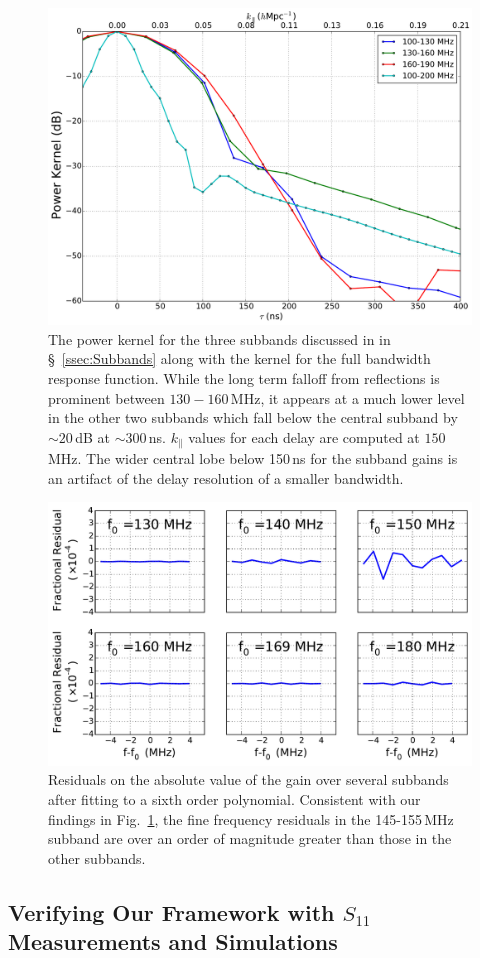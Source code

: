 \documentclass[twocolumn]{emulateapj}
\begin{document}
\begin{figure}[h!]
\includegraphics[width=.5\textwidth]{figures/powerKernelSubbands.pdf}
\caption{The power kernel for the three subbands discussed in in \S~\ref{ssec:Subbands} along with the kernel for the full bandwidth response function. While the long term falloff from reflections is prominent between $130-160$\,MHz, it appears at a much lower level in the other two subbands which fall below the central subband by $\sim 20$\,dB at $\sim 300$\,ns. $k_\parallel$ values for each delay are computed at $150$\,MHz. The wider central lobe below 150\,ns for the subband gains is an artifact of the delay resolution of a smaller bandwidth.}
\label{fig:KernelsSubbands}
\end{figure}

\begin{figure}
\includegraphics[width=.5\textwidth]{figures/frequency_domain_residuals.pdf}
\caption{Residuals on the absolute value of the gain over several subbands after fitting to a sixth order polynomial. Consistent with our findings in Fig.~\ref{fig:KernelsSubbands}, the fine frequency residuals in the 145-155\,MHz subband are over an order of magnitude greater than those in the other subbands.}
\label{fig:Residuals}
\end{figure}

\subsection{Verifying Our Framework with $S_{11}$ Measurements and Simulations}
\end{document}
